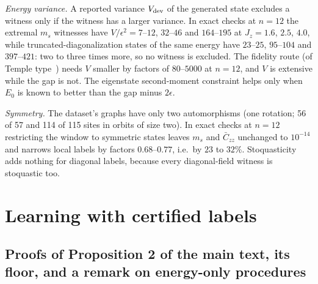 \documentclass[aps,prx,onecolumn,10pt,nofootinbib,longbibliography,floatfix]{revtex4-2}
\theoremstyle{remark}
\newcommand{\Jz}{J_z}
\newcommand{\ms}{m_s}
\newcommand{\Czz}{\bar C_{zz}}
\begin{document}
\emph{Energy variance.} A reported variance $V_{\rm dev}$ of the generated state excludes a witness only if the
witness has a larger variance. In exact checks at $n=12$ the extremal $\ms$ witnesses have $V/\epsilon^2=7$--$12$, %
$32$--$46$ and $164$--$195$ at $\Jz=1.6$, $2.5$, $4.0$, while truncated-diagonalization states of the same energy have %
$23$--$25$, $95$--$104$ and $397$--$421$: two to three times more, so no witness is excluded. The fidelity route %
(of Temple type~\cite{temple1928}) needs $V$ smaller by factors of $80$--$5000$ at $n=12$, and $V$ is extensive while the gap %
is not. The eigenstate second-moment constraint helps only when $E_0$ is known to better than the gap minus $2\epsilon$. %

\emph{Symmetry.} The dataset's graphs have only two automorphisms (one rotation; 56 of 57 and 114 of 115 sites in %
orbits of size two). In exact checks at $n=12$ restricting the window to symmetric states leaves $\ms$ and $\Czz$ %
unchanged to $10^{-14}$ and narrows local labels by factors $0.68$--$0.77$, i.e.\ by $23$ to $32\%$. %
Stoquasticity adds nothing for diagonal labels, because every diagonal-field witness is stoquastic too.

\section{Learning with certified labels}
\label{sm:learn}
\makeatletter\providecommand{\LTclearhead}{\global\setbox\LT@head\box\voidb@x}\makeatother

\subsection{Proofs of Proposition 2 of the main text, its floor, and a remark on energy-only procedures} %
\label{sm:prop2proofs}
\end{document}
